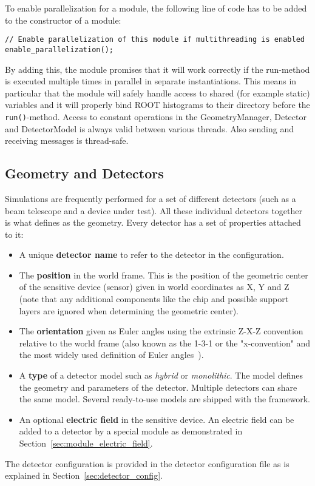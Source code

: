To enable parallelization for a module, the following line of code has to be added to the constructor of a module:
\begin{verbatim}
// Enable parallelization of this module if multithreading is enabled
enable_parallelization();
\end{verbatim}
By adding this, the module promises that it will work correctly if the run-method is executed multiple times in parallel in separate instantiations.
This means in particular that the module will safely handle access to shared (for example static) variables and it will properly bind ROOT histograms to their directory before the \texttt{run()}-method. 
Access to constant operations in the GeometryManager, Detector and DetectorModel is always valid between various threads. Also sending and receiving messages is thread-safe.

\subsection{Geometry and Detectors}
\label{sec:models_geometry}
Simulations are frequently performed for a set of different detectors (such as a beam telescope and a device under test).
All these individual detectors together is what \apsq defines as the geometry.
Every detector has a set of properties attached to it:
\begin{itemize}
\item A unique \textbf{detector name} to refer to the detector in the configuration.
\item The \textbf{position} in the world frame.
This is the position of the geometric center of the sensitive device (sensor) given in world coordinates as X, Y and Z (note that any additional components like the chip and possible support layers are ignored when determining the geometric center).
\item The \textbf{orientation} given as Euler angles using the extrinsic Z-X-Z convention relative to the world frame (also known as the 1-3-1 or the "x-convention" and the most widely used definition of Euler angles~\cite{eulerangles}).
\item A \textbf{type} of a detector model such as \emph{hybrid} or \emph{monolithic}.
The model defines the geometry and parameters of the detector.
Multiple detectors can share the same model.
Several ready-to-use models are shipped with the framework.
\item An optional \textbf{electric field} in the sensitive device.
An electric field can be added to a detector by a special module as demonstrated in Section~\ref{sec:module_electric_field}.
\end{itemize}
The detector configuration is provided in the detector configuration file as is explained in Section~\ref{sec:detector_config}.

